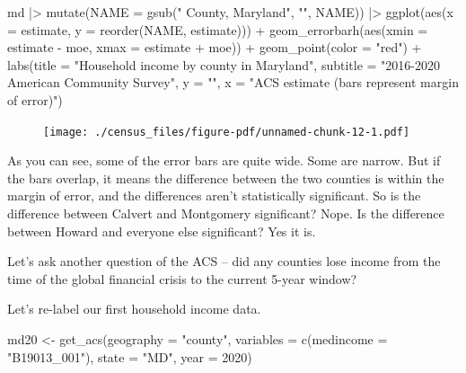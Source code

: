 \documentclass[
  letterpaper,
  DIV=11,
  numbers=noendperiod]{scrreprt}
\newenvironment{Shaded}{\begin{snugshade}}{\end{snugshade}}
\newcommand{\AttributeTok}[1]{\textcolor[rgb]{0.40,0.45,0.13}{#1}}
\newcommand{\DecValTok}[1]{\textcolor[rgb]{0.68,0.00,0.00}{#1}}
\newcommand{\FunctionTok}[1]{\textcolor[rgb]{0.28,0.35,0.67}{#1}}
\newcommand{\NormalTok}[1]{\textcolor[rgb]{0.00,0.23,0.31}{#1}}
\newcommand{\OtherTok}[1]{\textcolor[rgb]{0.00,0.23,0.31}{#1}}
\newcommand{\SpecialCharTok}[1]{\textcolor[rgb]{0.37,0.37,0.37}{#1}}
\newcommand{\StringTok}[1]{\textcolor[rgb]{0.13,0.47,0.30}{#1}}
\begin{document}
\begin{Shaded}
\begin{Highlighting}[]
\NormalTok{md }\SpecialCharTok{|\textgreater{}}
  \FunctionTok{mutate}\NormalTok{(}\AttributeTok{NAME =} \FunctionTok{gsub}\NormalTok{(}\StringTok{" County, Maryland"}\NormalTok{, }\StringTok{""}\NormalTok{, NAME)) }\SpecialCharTok{|\textgreater{}}
  \FunctionTok{ggplot}\NormalTok{(}\FunctionTok{aes}\NormalTok{(}\AttributeTok{x =}\NormalTok{ estimate, }\AttributeTok{y =} \FunctionTok{reorder}\NormalTok{(NAME, estimate))) }\SpecialCharTok{+}
  \FunctionTok{geom\_errorbarh}\NormalTok{(}\FunctionTok{aes}\NormalTok{(}\AttributeTok{xmin =}\NormalTok{ estimate }\SpecialCharTok{{-}}\NormalTok{ moe, }\AttributeTok{xmax =}\NormalTok{ estimate }\SpecialCharTok{+}\NormalTok{ moe)) }\SpecialCharTok{+}
  \FunctionTok{geom\_point}\NormalTok{(}\AttributeTok{color =} \StringTok{"red"}\NormalTok{) }\SpecialCharTok{+}
  \FunctionTok{labs}\NormalTok{(}\AttributeTok{title =} \StringTok{"Household income by county in Maryland"}\NormalTok{,}
       \AttributeTok{subtitle =} \StringTok{"2016{-}2020 American Community Survey"}\NormalTok{,}
       \AttributeTok{y =} \StringTok{""}\NormalTok{,}
       \AttributeTok{x =} \StringTok{"ACS estimate (bars represent margin of error)"}\NormalTok{)}
\end{Highlighting}
\end{Shaded}

\begin{figure}[H]

{\centering \texttt{[image: ./census\_files/figure-pdf/unnamed-chunk-12-1.pdf]}

}

\end{figure}

As you can see, some of the error bars are quite wide. Some are narrow.
But if the bars overlap, it means the difference between the two
counties is within the margin of error, and the differences aren't
statistically significant. So is the difference between Calvert and
Montgomery significant? Nope. Is the difference between Howard and
everyone else significant? Yes it is.

Let's ask another question of the ACS -- did any counties lose income
from the time of the global financial crisis to the current 5-year
window?

Let's re-label our first household income data.

\begin{Shaded}
\begin{Highlighting}[]
\NormalTok{md20 }\OtherTok{\textless{}{-}} \FunctionTok{get\_acs}\NormalTok{(}\AttributeTok{geography =} \StringTok{"county"}\NormalTok{,}
              \AttributeTok{variables =} \FunctionTok{c}\NormalTok{(}\AttributeTok{medincome =} \StringTok{"B19013\_001"}\NormalTok{),}
              \AttributeTok{state =} \StringTok{"MD"}\NormalTok{,}
              \AttributeTok{year =} \DecValTok{2020}\NormalTok{)}
\end{Highlighting}
\end{Shaded}
\end{document}
